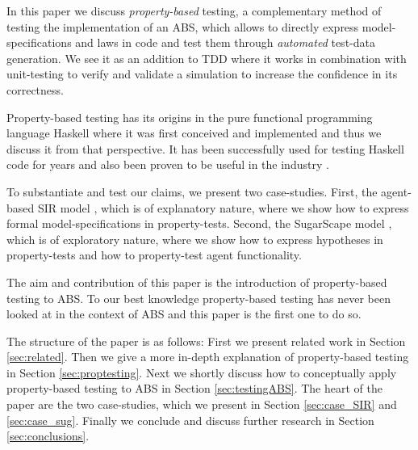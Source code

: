 
In this paper we discuss \textit{property-based} testing, a complementary method of testing the implementation of an ABS, which allows to directly express model-specifications and laws in code and test them through \textit{automated} test-data generation. We see it as an addition to TDD where it works in combination with unit-testing to verify and validate a simulation to increase the confidence in its correctness.

Property-based testing has its origins \cite{claessen_quickcheck_2000,claessen_testing_2002,runciman_smallcheck_2008} in the pure functional programming language Haskell \cite{hudak_history_2007} where it was first conceived and implemented and thus we discuss it from that perspective. It has been successfully used for testing Haskell code for years and also been proven to be useful in the industry \cite{hughes_quickcheck_2007}.

To substantiate and test our claims, we present two case-studies. First, the agent-based SIR model \cite{macal_agent-based_2010}, which is of explanatory nature, where we show how to express formal model-specifications in property-tests. Second, the SugarScape model \cite{epstein_growing_1996}, which is of exploratory nature, where we show how to express hypotheses in property-tests and how to property-test agent functionality. 

The aim and contribution of this paper is the introduction of property-based testing to ABS. To our best knowledge property-based testing has never been looked at in the context of ABS and this paper is the first one to do so.

The structure of the paper is as follows: First we present related work in Section \ref{sec:related}. Then we give a more in-depth explanation of property-based testing in Section \ref{sec:proptesting}. Next we shortly discuss how to conceptually apply property-based testing to ABS in Section \ref{sec:testingABS}. The heart of the paper are the two case-studies, which we present in Section \ref{sec:case_SIR} and \ref{sec:case_sug}. Finally we conclude and discuss further research in Section \ref{sec:conclusions}.